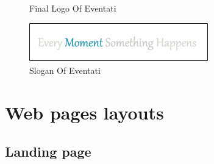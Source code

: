 \documentclass[12pt,a4paper,class,twoside,openany]{report}
\begin{document}
{\begin{figure}[ht]
\begin{minipage}[b]{0.5\linewidth}
	\caption{Final Logo Of Eventati}
	\label{fg:6-4}
	\end{minipage}
	\hspace{0.5cm}
	\begin{minipage}[b]{0.5\linewidth}
	\centering
	\includegraphics[width=\textwidth]{6-5}
	\caption{Slogan Of Eventati}
	\label{fg:6-5}
	\end{minipage}
	\end{figure}
\section{Web pages layouts}
\subsection{Landing page}
}
\end{document}
